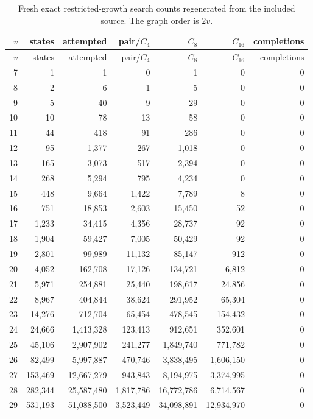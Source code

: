 \begin{longtable}{rrrrrrr}
\caption{Fresh exact restricted-growth search counts regenerated from the
included source. The graph order is $2v$.}\label{tab:frontier-counts}\\
\toprule
$v$ & states & attempted & pair/$C_4$ & $C_8$ & $C_{16}$ & completions\\
\midrule
\endfirsthead
\toprule
$v$ & states & attempted & pair/$C_4$ & $C_8$ & $C_{16}$ & completions\\
\midrule
\endhead
7 & 1 & 1 & 0 & 1 & 0 & 0\\
8 & 2 & 6 & 1 & 5 & 0 & 0\\
9 & 5 & 40 & 9 & 29 & 0 & 0\\
10 & 10 & 78 & 13 & 58 & 0 & 0\\
11 & 44 & 418 & 91 & 286 & 0 & 0\\
12 & 95 & 1,377 & 267 & 1,018 & 0 & 0\\
13 & 165 & 3,073 & 517 & 2,394 & 0 & 0\\
14 & 268 & 5,294 & 795 & 4,234 & 0 & 0\\
15 & 448 & 9,664 & 1,422 & 7,789 & 8 & 0\\
16 & 751 & 18,853 & 2,603 & 15,450 & 52 & 0\\
17 & 1,233 & 34,415 & 4,356 & 28,737 & 92 & 0\\
18 & 1,904 & 59,427 & 7,005 & 50,429 & 92 & 0\\
19 & 2,801 & 99,989 & 11,132 & 85,147 & 912 & 0\\
20 & 4,052 & 162,708 & 17,126 & 134,721 & 6,812 & 0\\
21 & 5,971 & 254,881 & 25,440 & 198,617 & 24,856 & 0\\
22 & 8,967 & 404,844 & 38,624 & 291,952 & 65,304 & 0\\
23 & 14,276 & 712,704 & 65,454 & 478,545 & 154,432 & 0\\
24 & 24,666 & 1,413,328 & 123,413 & 912,651 & 352,601 & 0\\
25 & 45,106 & 2,907,902 & 241,277 & 1,849,740 & 771,782 & 0\\
26 & 82,499 & 5,997,887 & 470,746 & 3,838,495 & 1,606,150 & 0\\
27 & 153,469 & 12,667,279 & 943,843 & 8,194,975 & 3,374,995 & 0\\
28 & 282,344 & 25,587,480 & 1,817,786 & 16,772,786 & 6,714,567 & 0\\
29 & 531,193 & 51,088,500 & 3,523,449 & 34,098,891 & 12,934,970 & 0\\
\bottomrule
\end{longtable}
